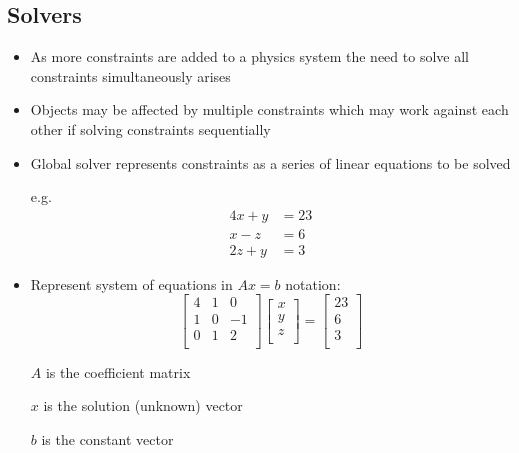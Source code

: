 \documentclass[a4paper]{article}
\begin{document}
\subsection{Solvers}

\begin{itemize}
  \item
    As more constraints are added to a physics system the need to solve all
    constraints simultaneously arises

  \item
    Objects may be affected by multiple constraints which may work against each
    other if solving constraints sequentially

  \item
    Global solver represents constraints as a series of linear equations to be
    solved

    e.g.
    \begin{align*}
      4x + y &= 23 \\
      x - z &= 6 \\
      2z + y &= 3
    \end{align*}

  \item
    Represent system of equations in \textbf{$Ax = b$} notation:
    \[
      \left [
        \begin{array}{ccc}
          4 & 1 & 0  \\
          1 & 0 & -1 \\
          0 & 1 & 2  \\
        \end{array}
      \right ]
      \left [
        \begin{array}{c}
          x \\
          y \\
          z \\
        \end{array}
      \right ]
      =
      \left [
        \begin{array}{c}
          23 \\
          6  \\
          3  \\
        \end{array}
      \right ]
    \]

    $A$ is the coefficient matrix

    $x$ is the solution (unknown) vector

    $b$ is the constant vector


\end{itemize}
\end{document}
